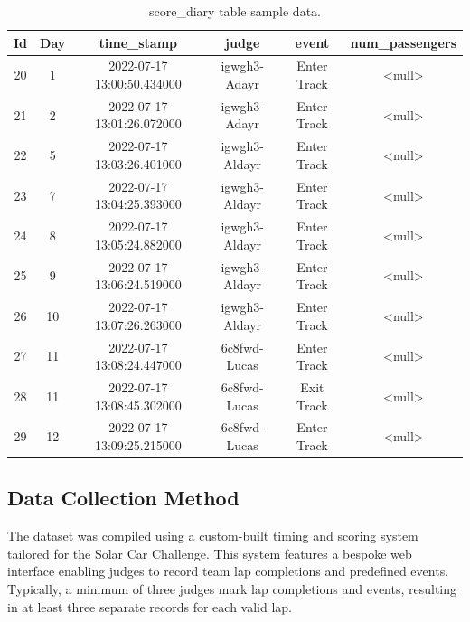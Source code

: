 \documentclass[11pt]{article}
\begin{document}
\begin{table}[H]
    \centering
    \begin{tabular}{|c|c|c|c|c|c|}
        \hline
        \textbf{Id} & \textbf{Day} & \textbf{time\_stamp}       & \textbf{judge} & \textbf{event} & \textbf{num\_passengers} \\
        \hline
        20          & 1            & 2022-07-17 13:00:50.434000 & igwgh3-Adayr   & Enter Track    & <null>                   \\
        21          & 2            & 2022-07-17 13:01:26.072000 & igwgh3-Adayr   & Enter Track    & <null>                   \\
        22          & 5            & 2022-07-17 13:03:26.401000 & igwgh3-Aldayr  & Enter Track    & <null>                   \\
        23          & 7            & 2022-07-17 13:04:25.393000 & igwgh3-Aldayr  & Enter Track    & <null>                   \\
        24          & 8            & 2022-07-17 13:05:24.882000 & igwgh3-Aldayr  & Enter Track    & <null>                   \\
        25          & 9            & 2022-07-17 13:06:24.519000 & igwgh3-Aldayr  & Enter Track    & <null>                   \\
        26          & 10           & 2022-07-17 13:07:26.263000 & igwgh3-Aldayr  & Enter Track    & <null>                   \\
        27          & 11           & 2022-07-17 13:08:24.447000 & 6c8fwd-Lucas   & Enter Track    & <null>                   \\
        28          & 11           & 2022-07-17 13:08:45.302000 & 6c8fwd-Lucas   & Exit Track     & <null>                   \\
        29          & 12           & 2022-07-17 13:09:25.215000 & 6c8fwd-Lucas   & Enter Track    & <null>                   \\
        \hline
    \end{tabular}
    \caption{score\_diary table sample data.}
    \label{tab:score_diary}
\end{table}

\subsection{Data Collection Method}

The dataset was compiled using a custom-built timing and scoring system tailored for the Solar Car Challenge. This system features a bespoke web interface enabling judges to record team lap completions and predefined events. Typically, a minimum of three judges mark lap completions and events, resulting in at least three separate records for each valid lap.
\end{document}
